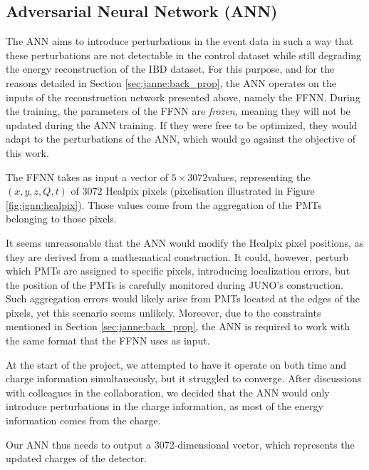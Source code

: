 \documentclass[../main.tex]{subfiles}
\begin{document}
\subsection{Adversarial Neural Network (ANN)}
\label{sec:janne:arch:ann}

The ANN aims to introduce perturbations in the event data in such a way that these perturbations are not detectable in the control dataset while still degrading the energy reconstruction of the IBD dataset. For this purpose, and for the reasons detailed in Section \ref{sec:janne:back_prop}, the ANN operates on the inputs of the reconstruction network presented above, namely the FFNN. During the training, the parameters of the FFNN are \textit{frozen,} meaning they will not be updated during the ANN training. If they were free to be optimized, they would adapt to the perturbations of the ANN, which would go against the objective of this work.

The FFNN takes as input a vector of $5 \times 3072$values, representing the $(x,y,z,Q,t)$ of 3072 Healpix pixels (pixelisation illustrated in Figure \ref{fig:jgnn:healpix}). Those values come from the aggregation of the PMTs belonging to those pixels.

It seems unreasonable that the ANN would modify the Healpix pixel positions, as they are derived from a mathematical construction. It could, however, perturb which PMTs are assigned to specific pixels, introducing localization errors, but the position of the PMTs is carefully monitored during JUNO's construction. Such aggregation errors would likely arise from PMTs located at the edges of the pixels, yet this scenario seems unlikely. Moreover, due to the constraints mentioned in Section \ref{sec:janne:back_prop}, the ANN is required to work with the same format that the FFNN uses as input.


At the start of the project, we attempted to have it operate on both time and charge information simultaneously, but it struggled to converge. After discussions with colleagues in the collaboration, we decided that the ANN would only introduce perturbations in the charge information, as most of the energy information comes from the charge.

Our ANN thus needs to output a 3072-dimensional vector, which represents the updated charges of the detector.
\end{document}
